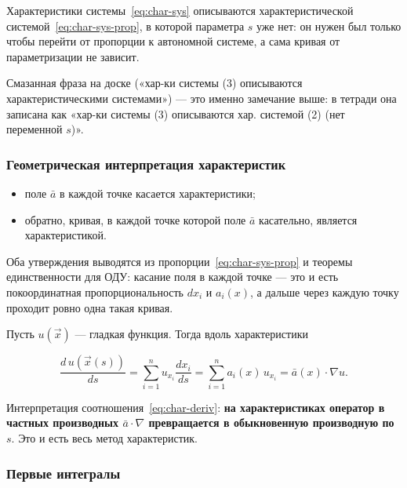 \begin{remark}
Характеристики системы~\eqref{eq:char-sys} описываются характеристической
системой~\eqref{eq:char-sys-prop}, в которой параметра $s$ уже нет: он нужен
был только чтобы перейти от пропорции к автономной системе, а сама кривая от
параметризации не зависит.
\end{remark}

\begin{warn}
Смазанная фраза на доске («хар-ки системы (3) описываются характеристическими
системами») — это именно замечание выше: в тетради она записана как «хар-ки
системы (3) описываются хар. системой (2) (нет переменной $s$)».
\end{warn}

\subsubsection*{Геометрическая интерпретация характеристик}

\begin{itemize}[leftmargin=1.6em]
  \item поле $\bar a$ в каждой точке касается характеристики;
  \item обратно, кривая, в каждой точке которой поле $\bar a$ касательно,
        является характеристикой.
\end{itemize}

Оба утверждения выводятся из пропорции~\eqref{eq:char-sys-prop} и теоремы
единственности для ОДУ: касание поля в каждой точке — это и есть
покоординатная пропорциональность $dx_i$ и $a_i(x)$, а дальше через каждую
точку проходит ровно одна такая кривая.

Пусть $u(\vec x)$ — гладкая функция. Тогда вдоль характеристики

\begin{equation}\tag{5}\label{eq:char-deriv}
  \frac{d\,u(\vec x(s))}{ds}
  = \sum_{i=1}^{n} u_{x_i} \frac{dx_i}{ds}
  = \sum_{i=1}^{n} a_i(x)\, u_{x_i}
  = \bar a(x) \cdot \nabla u .
\end{equation}

\begin{remark}
Интерпретация соотношения~\eqref{eq:char-deriv}: \textbf{на характеристиках
оператор в частных производных $\bar a \cdot \nabla$ превращается в обыкновенную
производную по $s$}. Это и есть весь метод характеристик.
\end{remark}

\subsubsection*{Первые интегралы}

